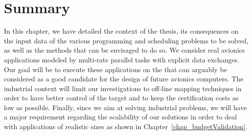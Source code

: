 \documentclass[main.tex]{subfiles}
\begin{document}
\section{Summary}
In this chapter, we have detailed the context of the thesis, its consequences on the input data of the various programming and scheduling problems to be solved, as well as the methods that can be envisaged to do so. We consider real avionics applications modeled by multi-rate parallel tasks with explicit data exchanges. Our goal will be to execute these applications on the \mppalong that can arguably be considered as a good candidate for the design of future avionics computers.
The industrial context will limit our investigations to off-line mapping techniques in order to have better control of the target and to keep the certification costs as low as possible. Finally, since we aim at solving industrial problems, we will have a major requirement regarding the scalability of our solutions in order to deal with applications of realistic sizes as shown in Chapter~\ref{chap_budgetValidation}.



\clearpage
\subbiblio
\end{document}
